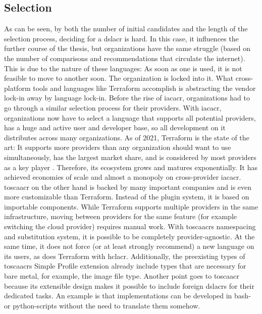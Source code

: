 \subsection{Selection}
As can be seen, by both the number of initial candidates and the length of the selection process, deciding for a \gls{dslacr} is hard. In this case, it  influences the further course of the thesis, but organizations have the same struggle (based on the number of comparisons and recommendations that circulate the internet).
This is due to the nature of these languages: As soon as one is used, it is not feasible to move to another soon. The organization is locked into it. What cross-platform tools and languages like Terraform accomplish is abstracting the vendor lock-in away by language lock-in. Before the rise of \gls{iacacr}, organizations had to go through a similar selection process for their providers. With \gls{iacacr}, organizations now have to select a language that supports all potential providers, has a huge and active user and developer base, so all development on it distributes across many organizations.
\newline
As of 2021, Terraform is the state of the art: It supports more providers than any organization should want to use simultaneously, has the largest market share, and is considered by most providers as a key player \cite{jetbrains_devops_ecosystem_2019}. Therefore, its ecosystem grows and matures exponentially. It has achieved economies of scale and almost a monopoly on cross-provider \gls{iacacr}.
\newline
\Gls{toscaacr} on the other hand is backed by many important companies and is even more customizable than Terraform. Instead of the plugin system, it is based on importable components. While Terraform supports multiple providers in the same infrastructure, moving between providers for the same feature (for example switching the cloud provider) requires manual work. With \gls{toscaacr}s namespacing and substitution system, it is possible to be completely provider-agnostic. At the same time, it does not force (or at least strongly recommend) a new language on its users, as does Terraform with \gls{hclacr}. Additionally, the preexisting types of \gls{toscaacr}s Simple Profile extension already include types that are necessary for bare metal, for example, the image file type. Another point goes to \gls{toscaacr} because its extensible design makes it possible to include foreign \gls{dslacr}s for their dedicated tasks. An example is that implementations can be developed in bash- or python-scripts without the need to translate them somehow.

